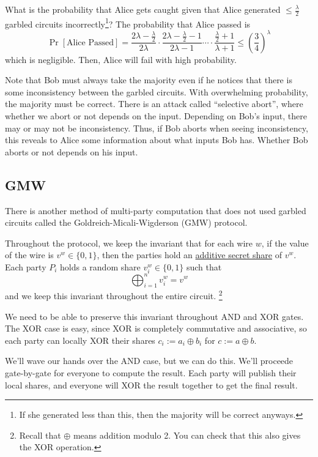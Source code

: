 What is the probability that Alice gets caught given that Alice generated $\leq \frac{\lambda}{2}$ garbled circuits incorrectly\footnote{If she generated less than this, then the majority will be correct anyways.}? The probability that Alice passed is
\[\Pr\left[ \text{Alice Passed} \right] = \frac{2\lambda - \frac{\lambda}{2}}{2\lambda}\cdot \frac{2\lambda - \frac{\lambda}{2} - 1}{2\lambda - 1} \cdots \cdot \frac{\frac{\lambda}{2} + 1}{\lambda + 1} \leq \left( \frac{3}{4} \right)^\lambda\]
which is negligible. Then, Alice will fail with high probability.

Note that Bob must always take the majority even if he notices that there is some inconsistency between the garbled circuits. With overwhelming probability, the majority must be correct. There is an attack called ``selective abort'', where whether we abort or not depends on the input. Depending on Bob's input, there may or may not be inconsistency. Thus, if Bob aborts when seeing inconsistency, this reveals to Alice some information about what inputs Bob has. Whether Bob aborts or not depends on his input.

\subsection{GMW}

There is another method of multi-party computation that does not used garbled circuits called the Goldreich-Micali-Wigderson (GMW) protocol.

Throughout the protocol, we keep the invariant that for each wire $w$, if the value of the wire is $v^w \in\{0, 1\}$, then the parties hold an \ul{additive secret share} of $v^w$. Each party $P_i$ holds a random share $v_i^w\in\{0,1\}$ such that
\[\bigoplus_{i=1}^n v_i^w = v^w\]
and we keep this invariant throughout the entire circuit. \footnote{Recall that $\oplus$ means addition modulo 2. You can check that this also gives the XOR operation.}

We need to be able to preserve this invariant throughout \textsf{AND} and \textsf{XOR} gates. The \textsf{XOR} case is easy, since \textsf{XOR} is completely commutative and associative, so each party can locally \textsf{XOR} their shares $c_i := a_i\oplus b_i$ for $c := a\oplus b$.

We'll wave our hands over the \textsf{AND} case, but we can do this. We'll proceede gate-by-gate for everyone to compute the result. Each party will publish their local shares, and everyone will \textsf{XOR} the result together to get the final result.

